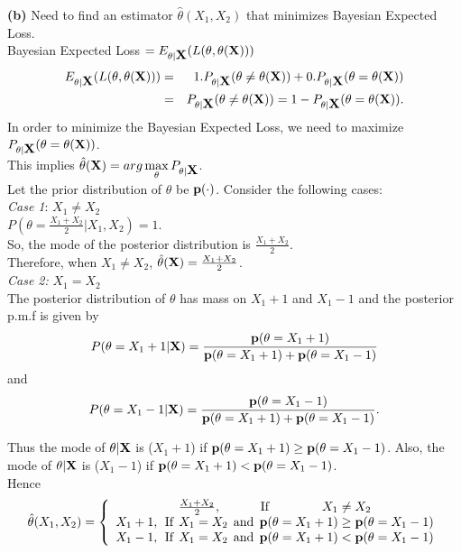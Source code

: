 \textbf{(b)} Need to find an estimator $\hat{\theta}(X_1,X_2)$ that minimizes Bayesian Expected Loss. \\

Bayesian Expected Loss $=E_{\theta|\hbox{\bf X}}(L(\theta,\theta(\hbox{\bf X})))$
\begin{eqnarray}
E_{\theta|\hbox{\bf X}}(L(\theta,\theta(\hbox{\bf X}))) &=& 1. P_{\theta|\hbox{\bf X}}(\theta\neq \theta(\hbox{\bf X}))+0. P_{\theta|\hbox{\bf X}}(\theta=\theta(\hbox{\bf X}))\nonumber\\
&=& P_{\theta|\hbox{\bf X}}(\theta\neq \theta(\hbox{\bf X}))=1-P_{\theta|\hbox{\bf X}}(\theta=\theta(\hbox{\bf X}))\nonumber.
\end{eqnarray}
In order to minimize the Bayesian Expected Loss, we need to maximize \\
$P_{\theta|\hbox{\bf X}}(\theta=\theta(\hbox{\bf X}))$. \\
This implies
$\hat{\theta}(\hbox{\bf X})=arg\max\limits_{\theta} P_{\theta|\hbox{\bf X}}$. \\

Let the prior distribution of $\theta$ be $\hbox{\bf p}(\cdot)$. 
Consider the following cases:\\

\emph{Case 1}: $X_1\neq X_2$ \\

$P(\theta=\frac{X_1+X_2}{2}|X_1,X_2)=1$. \\So, the mode of the posterior distribution is $\frac{X_1+X_2}{2}$. \\Therefore, when $X_1\neq X_2$, $\hat{\theta}(\hbox{\bf X})={{X_1+X_2}\over{2}}$. \\

\emph{Case 2:} $X_1=X_2$\\

The posterior distribution of $\theta$ has mass on $X_1+1$ and $X_1-1$ and the posterior p.m.f is given by
\begin{equation}
P(\theta=X_1+1|\hbox{\bf X})={{\hbox{\bf p}(\theta=X_1+1)}\over{\hbox{\bf p}(\theta=X_1+1)+\hbox{\bf p}(\theta=X_1-1)}}\nonumber
\end{equation}
and 
\begin{equation}
P(\theta=X_1-1|\hbox{\bf X})={{\hbox{\bf p}(\theta=X_1-1)}\over{\hbox{\bf p}(\theta=X_1+1)+\hbox{\bf p}(\theta=X_1-1)}}.\nonumber
\end{equation}


Thus the mode of $\theta|\hbox{\bf X}$ is ($X_1+1$) if $\hbox{\bf p}(\theta=X_1+1)\geq \hbox{\bf p}(\theta=X_1-1)$. Also, the mode of $\theta|\hbox{\bf X}$ is ($X_1-1$) if $\hbox{\bf p}(\theta=X_1+1) < \hbox{\bf p}(\theta=X_1-1)$. \\
Hence
$$
\hat{\theta}(X_1,X_2)=\left\{\begin{array}{c}
{{X_1+X_2}\over{2}}, \:\:\:\:\:\:\:\:\:\:\:\:\:\:\mbox{If}\:\:\:\:\:\:\:\:\:\:\:\:\:\:\:\:\:\:\:X_1\neq X_2\\
X_1+1,\:\:\mbox{If}\:\:X_1=X_2\:\:\mbox{and}\:\:\hbox{\bf p}(\theta=X_1+1)\geq \hbox{\bf p}(\theta=X_1-1)\\
X_1-1,\:\:\mbox{If}\:\:X_1=X_2\:\:\mbox{and}\:\:\hbox{\bf p}(\theta=X_1+1)<\hbox{\bf p}(\theta=X_1-1)\\
\end{array}
\right.
$$

